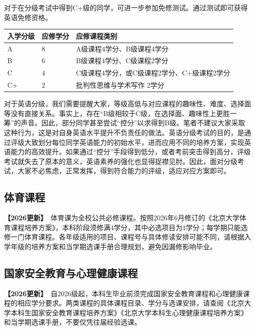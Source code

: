 \documentclass[11pt,oneside]{book}
\newcommand{\updateMark}{\textcolor{chaph}{\textbf{【2026更新】}}\ }
\begin{document}
\vspace{10pt}

对于在分级考试中得到C+级的同学，可进一步参加免修测试。通过测试即可获得英语免修资格。

\begin{table}[htbp]
	\centering
	
	\begin{tabular}{| l | l | l |}
		\hline
		入学分级 & 应修学分 & 应修课程类别 \\
		\hline
		A & 8 & A级课程4学分、B级课程4学分 \\
		\hline
		B & 6 & B级课程4学分、C级课程2学分 \\
		\hline
		C & 4 & C级课程4学分，或C级课程2学分、C+级课程2学分 \\
		\hline
		C$+$  & 2 & 批判性思维与学术写作\hspace{6pt} 2学分 \\
		\hline
		
	\end{tabular}
	
\end{table}

对于英语分级，我们需要提醒大家，等级高低与对应课程的趣味性、难度、选择面等没有直接关系。事实上，存在“B级相较于C级，在选择面、趣味性上更胜一筹”的声音。因此，部分同学甚至尝试“控分”以求得到B级。笔者不建议大家采取这种行为，这是对自身英语水平提升不负责任的做法。英语分级考试的目的，是通过评级大致划分每位同学英语能力的初始水平，进而应用不同的培养方案，实现英语能力的高效提升。如果通过“控分”手段得到低分，或者考前突击得到高分，评级考试就失去了原本的意义，英语素养的强化也显得捉襟见肘。因此，面对分级考试，大家不必焦虑，正常发挥，得到符合能力的评级，适应对应方案即可。

\subsection{体育课程}

\updateMark 体育课为全校公共必修课程。按照2026年6月修订的《北京大学体育课程培养方案》，本科阶段须修满4学分，其中必选项目为1学分；每学期只能选修一门体育课程。各年级适用的项目、课程号与具体修读安排可能不同，请根据入学年级的培养方案和当学期选课手册合理规划，避免因漏修影响毕业。

\subsection{国家安全教育与心理健康课程}

\updateMark 自2026级起，本科生毕业前须完成国家安全教育课程和心理健康课程的相应学分要求。两类课程的具体课程目录、学分与选课安排，请查阅《北京大学本科生国家安全教育课程培养方案》《北京大学本科生心理健康课程培养方案》和当学期选课手册，不要仅凭往届经验选课。
\end{document}
